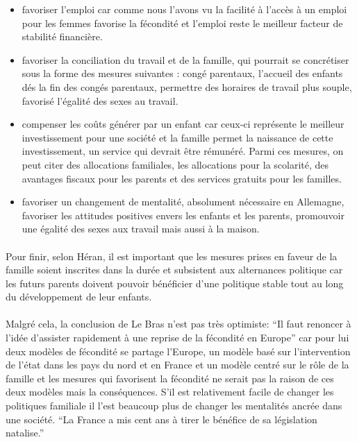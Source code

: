 \begin{itemize}
  \item favoriser l’emploi car comme nous l’avons vu la facilité à l’accès à un emploi pour les femmes favorise la fécondité et l’emploi reste le meilleur facteur de stabilité financière. 
  \item favoriser la conciliation du travail et de la famille, qui pourrait se concrétiser sous la forme des mesures suivantes : congé parentaux, l’accueil des enfants dés la fin des congés parentaux, permettre des horaires de travail plus souple, favorisé l’égalité des sexes au travail. 
  \item compenser les coûts générer par un enfant car ceux-ci représente le meilleur investissement pour une société et la famille permet la naissance de cette investissement, un service qui devrait être rémunéré. Parmi ces mesures, on peut citer des allocations familiales, les allocations pour la scolarité, des avantages fiscaux pour les parents et des services gratuits pour les familles.
  \item favoriser un changement de mentalité, absolument nécessaire en Allemagne, favoriser les attitudes positives envers les enfants et les parents, promouvoir une égalité des sexes aux travail mais aussi à la maison. 
\end{itemize}

\paragraph{}Pour finir, selon Héran, il est important que les mesures prises en faveur de la famille soient inscrites dans la durée et subsistent aux alternances politique car les futurs parents doivent pouvoir bénéficier d’une politique stable tout au long du développement de leur enfants\citep[pp.14]{heran}. 

\paragraph{}Malgré cela, la conclusion de Le Bras n’est pas très optimiste: “Il faut renoncer à l’idée d’assister rapidement à une reprise de la fécondité en Europe”\citep[pp.27]{heran} car pour lui deux modèles de fécondité se partage l’Europe, un modèle basé sur l’intervention de l’état dans les pays du nord et en France et un modèle centré sur le rôle de la famille et les mesures qui favorisent la fécondité ne serait pas la raison de ces deux modèles mais la conséquences. S’il est relativement facile de changer les politiques familiale il l’est beaucoup plus de changer les mentalités ancrée dans une société. “La France a mis cent ans à tirer le bénéfice de sa législation natalise.”\citep[pp.28]{heran}

